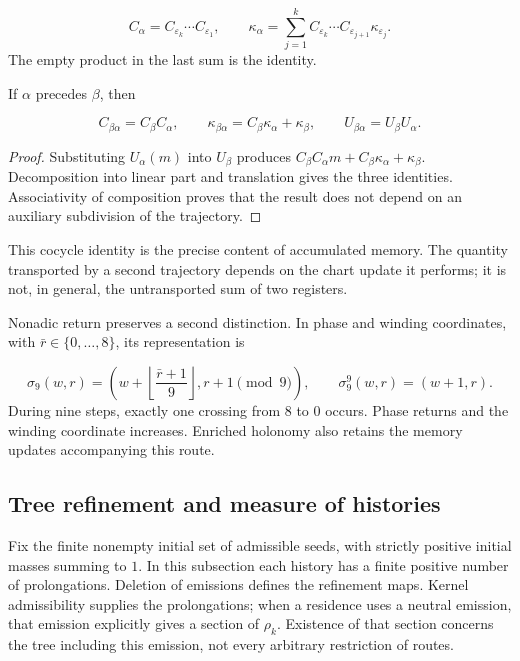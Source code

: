\[
C_\alpha=C_{\varepsilon_k}\cdots C_{\varepsilon_1},
\qquad
\kappa_\alpha=
\sum_{j=1}^{k}C_{\varepsilon_k}\cdots
C_{\varepsilon_{j+1}}\kappa_{\varepsilon_j}.
\]
The empty product in the last sum is the identity.

\begin{proposition}
\label{iv:cont:concatenacion}
If \(\alpha\) precedes \(\beta\), then

\[
C_{\beta\alpha}=C_\beta C_\alpha,
\qquad
\kappa_{\beta\alpha}=C_\beta\kappa_\alpha+\kappa_\beta,
\qquad
U_{\beta\alpha}=U_\beta U_\alpha.
\]
\end{proposition}
\begin{proof}
Substituting \(U_\alpha(m)\) into \(U_\beta\) produces \(C_\beta C_\alpha m+C_\beta\kappa_\alpha+\kappa_\beta\). Decomposition into linear part and translation gives the three identities. Associativity of composition proves that the result does not depend on an auxiliary subdivision of the trajectory.
\end{proof}

This cocycle identity is the precise content of accumulated memory. The quantity transported by a second trajectory depends on the chart update it performs; it is not, in general, the untransported sum of two registers.

Nonadic return preserves a second distinction. In phase and winding coordinates, with \(\bar r\in\{0,\ldots,8\}\), its representation is

\[
\sigma_9(w,r)=
\left(w+\left\lfloor\frac{\bar r+1}{9}\right\rfloor,
r+1\pmod9\right),
\qquad
\sigma_9^9(w,r)=(w+1,r).
\]
During nine steps, exactly one crossing from \(8\) to \(0\) occurs. Phase returns and the winding coordinate increases. Enriched holonomy also retains the memory updates accompanying this route.

\subsection{Tree refinement and measure of histories}
\label{iv:cont:medida}
Fix the finite nonempty initial set of admissible seeds, with strictly positive initial masses summing to \(1\). In this subsection each history has a finite positive number of prolongations. Deletion of emissions defines the refinement maps. Kernel admissibility supplies the prolongations; when a residence uses a neutral emission, that emission explicitly gives a section of \(\rho_k\). Existence of that section concerns the tree including this emission, not every arbitrary restriction of routes.


